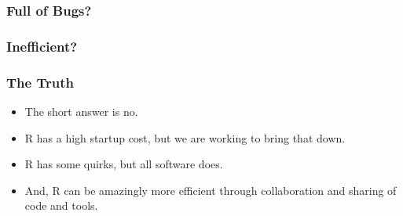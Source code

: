 \documentclass{beamer}
\begin{document}
{
\begin{frame}[plain]
\frametitle{Full of Bugs?}
\end{frame}
}

{
\begin{frame}[plain]
\frametitle{Inefficient?}
\end{frame}
}


\begin{frame}
\frametitle{The Truth}
\begin{itemize}
   \item The short answer is no. 
   \pause
   \item R has a high startup cost, but we are working to bring that down. 
   \pause
   \item R has some quirks, but all software does.
   \pause
   \item And, R can be amazingly more efficient through collaboration and sharing of code and tools.
\end{itemize}
\end{frame}
\end{document}
